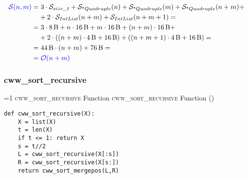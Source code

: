            \begin{frame}{\cwwSortMergePoscostframe}
                \begin{align*}
                    \textcolor{blue}{\mathcal{S}{\left(n , m\right)}} = & \; 3 \cdot \mathcal{S}_{size\_t} + \mathcal{S}_{\textnormal{*}Quadruple}{\left(n\right)} + \mathcal{S}_{\textnormal{*}Quadruple}{\left(m\right)} + \mathcal{S}_{\textnormal{*}Quadruple}{\left(n + m\right)} + \\
                    & + 2 \cdot \mathcal{S}_{IntList}{\left(n + m\right)} + \mathcal{S}_{IntList}{\left(n + m + 1\right)} = \\
                    = & \; 3 \cdot \SI{8}{B} + n \cdot \SI{16}{B} + m \cdot \SI{16}{B} + \left(n + m\right) \cdot \SI{16}{B} + \\
                    & + 2 \cdot \left(\left(n + m\right) \cdot \SI{4}{B} + \SI{16}{B}\right) + \left(\left(n + m + 1\right) \cdot \SI{4}{B} + \SI{16}{B}\right) = \\
                    = & \; \SI{44}{B} \cdot \left(n + m\right) + \SI{76}{B} = \\
                    = & \; \textcolor{blue}{\mathcal{O}{\left(n + m\right)}}
                \end{align*}
            \end{frame}

        \subsubsection{cww\_sort\_recursive}
\setcounter{cwwsortrecursivefunctioncounter}{1}
\newcommand{\cwwsortrecursivefunctionframe}{%
    \ifnum\value{cwwsortrecursivefunctioncounter}=1
        \textsc{cww\_sort\_recursive} Function%
    \else
        \textsc{cww\_sort\_recursive} Function (\thecwwsortrecursivefunctioncounter)%
    \fi
}
            \begin{frame}[containsverbatim]{\cwwsortrecursivefunctionframe}
                \begin{verbatim}
def cww_sort_recursive(X):
    X = list(X)
    t = len(X)
    if t <= 1: return X
    s = t//2
    L = cww_sort_recursive(X[:s])
    R = cww_sort_recursive(X[s:])
    return cww_sort_mergepos(L,R)
                    \end{verbatim}
            \end{frame}

